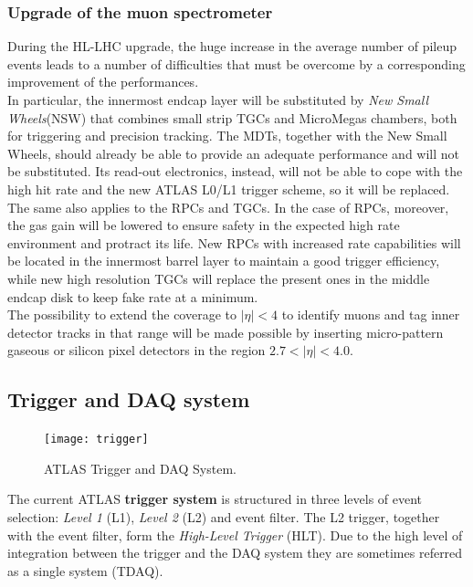 \documentclass[a4paper,twoside,12pt]{article}
\begin{document}
\subsubsection*{Upgrade of the muon spectrometer}\cite{scoping}
During the HL-LHC upgrade, the huge increase in the average number of pileup events leads to a number of difficulties that must be overcome by a corresponding improvement of the performances\cite{scoping}.\\

In particular, the innermost endcap layer will be substituted by \textit{New Small Wheels}(NSW) that combines small strip TGCs and MicroMegas chambers, both for triggering and 
precision tracking. The MDTs, together with the New Small Wheels, should already be able to provide an adequate performance and will not be substituted. Its read-out electronics, instead, will not 
be able to cope with the high hit rate and the new ATLAS L0/L1 trigger scheme, so it will be replaced. The same also applies to the RPCs and TGCs. In the case of RPCs, moreover,
the gas gain will be lowered to ensure safety in the expected high rate environment and protract its life. New RPCs with increased rate capabilities will be located in the innermost barrel layer to maintain a
good trigger efficiency, while new high resolution TGCs will replace the present ones in the middle endcap disk to keep fake rate at a minimum.\\

The possibility to extend the coverage to $|\eta| < 4$ to identify muons and tag inner detector tracks in that range will be made possible by inserting micro-pattern gaseous or silicon pixel
detectors in the region $2.7 < |\eta| < 4.0$.

\subsection{Trigger and DAQ system}

\begin{figure} [h]
	\centering
	\texttt{[image: trigger]}
	\caption{ATLAS Trigger and DAQ System\cite{Green:2010zza}.}
	\label{fig:trigger}
\end{figure}

The current ATLAS \textbf{trigger system} is structured in three levels of event selection: \textit{Level 1} (L1), \textit{Level 2} (L2) and event filter\cite{Aad:2008zzm}. The L2 trigger, together
with the event filter, form the \textit{High-Level Trigger} (HLT). Due to the high level of integration between the trigger and the DAQ system they are sometimes referred as a single system (TDAQ).\\
\end{document}
